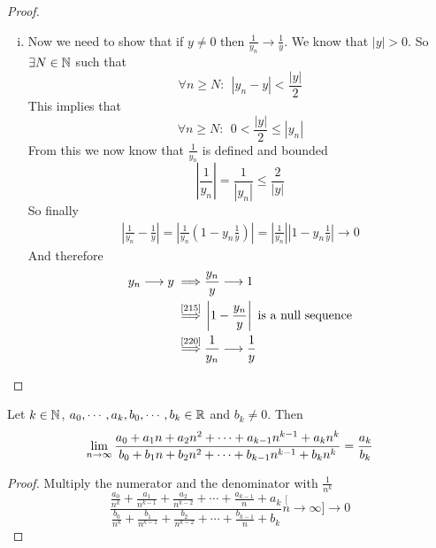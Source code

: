 \documentclass[../../script.tex]{subfiles}
\begin{document}
\begin{proof}
\begin{enumerate}[(i)]
	\item Now we need to show that if $y \ne 0$ then $\frac{1}{y_n} \rightarrow \frac{1}{y}$. We know that $|y| > 0$. So $\exists N \in \mathbb{N}$ such that
	\begin{equation}
		\forall n \ge N: ~~|y_n - y| < \frac{|y|}{2}
	\end{equation}
	This implies that
	\begin{equation}
		\forall n \ge N: ~~0 < \frac{|y|}{2} \le |y_n|
	\end{equation}
	From this we now know that $\frac{1}{y_n}$ is defined and bounded
	\begin{equation}
		\left|\frac{1}{y_n}\right| = \frac{1}{|y_n|} \le \frac{2}{|y|}
	\end{equation}
	So finally
	\begin{equation}
	\begin{split}
		\left| \frac{1}{y_n} - \frac{1}{y} \right| = \left| \frac{1}{y_n} \left(1 - y_n \frac{1}{y}\right) \right| = \left| \frac{1}{y_n} \right| \left| 1 - y_n \frac{1}{y} \right| \longrightarrow 0
	\end{split}
	\end{equation}
	And therefore
	\begin{equation}
	\begin{split}
		y_n \longrightarrow y \implies &\frac{y_n}{y} \longrightarrow 1 \\
		\implbl{\cref{215}} &\left|1 - \frac{y_n}{y}\right| \text{ is a null sequence} \\
		\implbl{\cref{220}} &\frac{1}{y_n} \longrightarrow \frac{1}{y}
	\end{split}
	\end{equation}
\end{enumerate}
\end{proof}

\begin{cor}\label{cor:polynomial}
Let $k \in \mathbb{N}$, $a_0, \cdots, a_k, b_0, \cdots, b_k \in \mathbb{R}$ and $b_k \ne 0$. Then
\[
	\lim_{n \rightarrow \infty} \frac{a_0 + a_1n + a_2n^2 + \cdots + a_{k-1}n^{k-1} + a_kn^k}{b_0 + b_1n + b_2n^2 + \cdots + b_{k-1}n^{k-1} + b_kn^k} = \frac{a_k}{b_k}
\]
\end{cor}
\begin{proof}
Multiply the numerator and the denominator with $\frac{1}{n^k}$
\begin{equation}
	\frac{\frac{a_0}{n^k} + \frac{a_1}{n^{k-1}} + \frac{a_2}{n^{k-2}} + \cdots + \frac{a_{k-1}}{n} + a_k}{\frac{b_0}{n^k} + \frac{b_1}{n^{k-1}} + \frac{b_2}{n^{k-2}} + \cdots + \frac{b_{k-1}}{n} + b_k} \stackrel[n \rightarrow \infty]{}{\longrightarrow} 0
\end{equation}
\end{proof}
\end{document}
